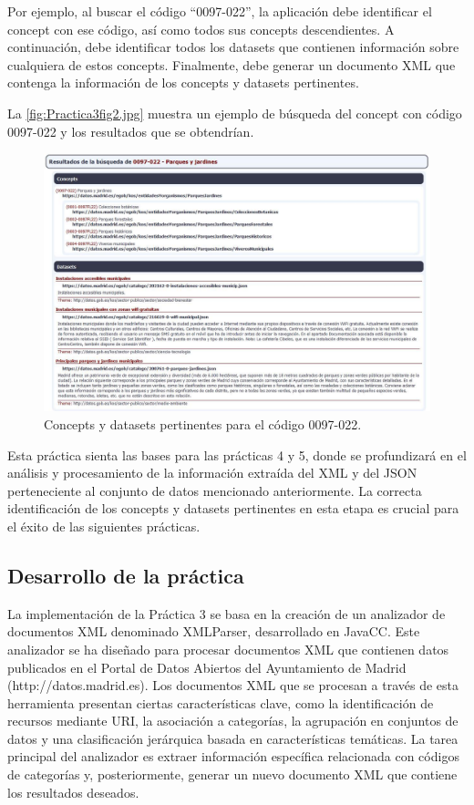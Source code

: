 Por ejemplo, al buscar el código ``0097-022'', la aplicación debe identificar el concept con ese código, así como todos sus concepts descendientes. A continuación, debe identificar todos los datasets que contienen información sobre cualquiera de estos concepts. Finalmente, debe generar un documento XML que contenga la información de los concepts y datasets pertinentes.

La \autoref{fig:Practica3fig2.jpg} muestra un ejemplo de búsqueda del concept con código 0097-022 y los resultados que se obtendrían.

\begin{figure}[H]
    \centering
    \includegraphics[width=\textwidth]{imagenes/Practica3fig2.jpg}
    \caption{Concepts y datasets pertinentes para el código 0097-022.}
    \label{fig:Practica3fig2.jpg}
\end{figure}

Esta práctica sienta las bases para las prácticas 4 y 5, donde se profundizará en el análisis y procesamiento de la información extraída del XML y del JSON perteneciente al conjunto de datos mencionado anteriormente. La correcta identificación de los concepts y datasets pertinentes en esta etapa es crucial para el éxito de las siguientes prácticas.

\subsection{Desarrollo de la práctica}

\noindent La implementación de la Práctica 3 se basa en la creación de un analizador de documentos XML denominado XMLParser, desarrollado en JavaCC. Este analizador se ha diseñado para procesar documentos XML que contienen datos publicados en el Portal de Datos Abiertos del Ayuntamiento de Madrid (http://datos.madrid.es).
Los documentos XML que se procesan a través de esta herramienta presentan ciertas características clave, como la identificación de recursos mediante URI, la asociación a categorías, la agrupación en conjuntos de datos y una clasificación jerárquica basada en características temáticas. La tarea principal del analizador es extraer información específica relacionada con códigos de categorías y, posteriormente, generar un nuevo documento XML que contiene los resultados deseados.

